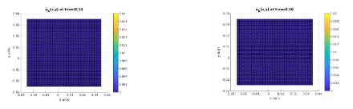 \documentclass[9pt]{beamer}
\begin{document}
\begin{frame}
\begin{columns}
\begin{column}{0.25\textwidth}
\begin{figure}[h]
    			\includegraphics[width=\textwidth]{tc1-1/014.jpg}
    		\end{figure}
    	\end{column}
    	\begin{column}{0.25\textwidth}
    		\begin{figure}[h]
    			\includegraphics[width=\textwidth]{tc1-1/016.jpg}
    		\end{figure}
    	\end{column}
    \end{columns}
	\vspace{3mm}
\end{frame}
\end{document}
